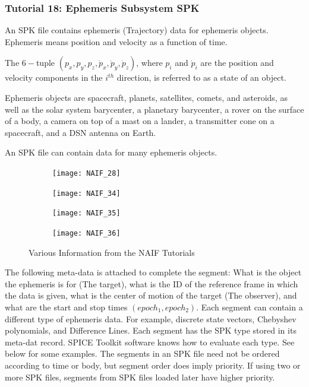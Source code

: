 \documentclass[crop=false,class=book]{standalone}
\begin{document}
\subsubsection{Tutorial 18: Ephemeris Subsystem SPK}
An SPK file contains ephemeris (Trajectory) data for ephemeris objects. Ephemeris means position and velocity as a function of time.
\begin{definition}
The $6-$tuple $(p_{x},p_{y},p_{z},\dot{p}_{x},\dot{p}_{y},\dot{p}_{z})$, where $p_{i}$ and $\dot{p}_{i}$ are the position and velocity components in the $i^{th}$ direction, is referred to as a state of an object.
\end{definition}
\begin{definition}
Ephemeris objects are spacecraft, planets, satellites, comets, and asteroids, as well as the solar system barycenter, a planetary barycenter, a rover on the surface of a body, a camera on top of a mast on a lander, a transmitter cone on a spacecraft, and a DSN antenna on Earth.
\end{definition}
An SPK file can contain data for many ephemeris objects.
\begin{figure}[H]
    \centering
    \begin{subfigure}[b]{0.49\textwidth}
        \texttt{[image: NAIF\_28]}
    \end{subfigure}
    \begin{subfigure}[b]{0.49\textwidth}
        \texttt{[image: NAIF\_34]}
    \end{subfigure}
    \begin{subfigure}[b]{0.49\textwidth}
        \texttt{[image: NAIF\_35]}
    \end{subfigure}
    \begin{subfigure}[b]{0.49\textwidth}
        \texttt{[image: NAIF\_36]}
    \end{subfigure}
    \caption{Various Information from the NAIF Tutorials}
    \label{fig:naif_information_stuff}
\end{figure}
The following meta-data is attached to complete the segment: What is the object the ephemeris is for (The target), what is the ID of the reference frame in which the data is given, what is the center of motion of the target (The observer), and what are the start and stop times $(epoch_1, epoch_2)$. Each segment can contain a different type of ephemeris data. For example, discrete state vectors, Chebyshev polynomials, and Difference Lines. Each segment has the SPK type stored in its meta-dat record. SPICE Toolkit software knows how to evaluate each type. See below for some examples. The segments in an SPK file need not be ordered according to time or body, but segment order does imply priority. If using two or more SPK files, segments from SPK files loaded later have higher priority. 
\end{document}
